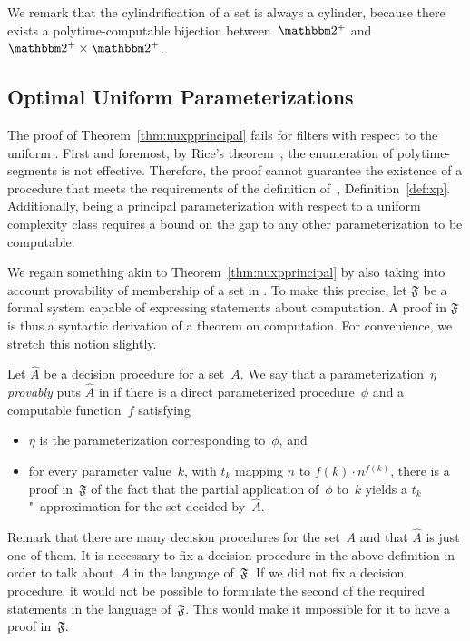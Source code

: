 We remark that the cylindrification of a set is always a \pdash{}cylinder, because there exists a polytime-computable bijection between~$\binary^+$ and~$\binary^+ \times \binary^+$.

\subsection{Optimal Uniform Parameterizations}
\label{sec:tractability:optimal}%
\label{sec:optimal_uniform_parameterizations}%
The proof of Theorem~\ref{thm:nuxpprincipal} fails for filters with respect to the uniform .
First and foremost, by Rice's theorem~\parencite{rice1953classes}, the enumeration of polytime-segments is not effective.
Therefore, the proof cannot guarantee the existence of a procedure that meets the requirements of the definition of~, Definition~\ref{def:xp}.
Additionally, being a principal parameterization with respect to a uniform complexity class requires a bound on the gap to any other parameterization to be computable.

We regain something akin to Theorem~\ref{thm:nuxpprincipal} by also taking into account provability of membership of a set in .
To make this precise, let $\mathfrak{F}$ be a formal system capable of expressing statements about computation.
A proof in $\mathfrak{F}$ is thus a syntactic derivation of a theorem on computation.
For convenience, we stretch this notion slightly.
\begin{definition}
\label{def:provably}%
  Let $\hat{A}$ be a decision procedure for a set~$A$.
  We say that a parameterization~$\eta$ \emph{provably} puts $\hat{A}$ in  if there is a direct parameterized procedure~$\phi$ and a computable function~$f$ satisfying
  \begin{itemize}
  \item $\eta$ is the parameterization corresponding to~$\phi$, and
  \item for every parameter value~$k$, with $t_k$ mapping $n$ to $f(k) \cdot n^{f(k)}$, there is a proof in~$\mathfrak{F}$ of the fact that the partial application of~$\phi$ to~$k$ yields a $t_k$"~approximation for the set decided by~$\hat{A}$.
  \end{itemize}
\end{definition}

Remark that there are many decision procedures for the set~$A$ and that $\hat{A}$ is just one of them.
It is necessary to fix a decision procedure in the above definition in order to talk about~$A$ in the language of~$\mathfrak{F}$.
If we did not fix a decision procedure, it would not be possible to formulate the second of the required statements in the language of~$\mathfrak{F}$.
This would make it impossible for it to have a proof in~$\mathfrak{F}$.

